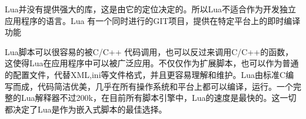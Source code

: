 Lua并没有提供强大的库，这是由它的定位决定的。所以Lua不适合作为开发独立应用程序的语言。Lua 有一个同时进行的GIT项目，提供在特定平台上的即时编译功能

Lua脚本可以很容易的被C/C++ 代码调用，也可以反过来调用C/C++的函数，这使得Lua在应用程序中可以被广泛应用。不仅仅作为扩展脚本，也可以作为普通的配置文件，代替XML,ini等文件格式，并且更容易理解和维护。Lua由标准C编写而成，代码简洁优美，几乎在所有操作系统和平台上都可以编译，运行。一个完整的Lua解释器不过200k，在目前所有脚本引擎中，Lua的速度是最快的。这一切都决定了Lua是作为嵌入式脚本的最佳选择。

















